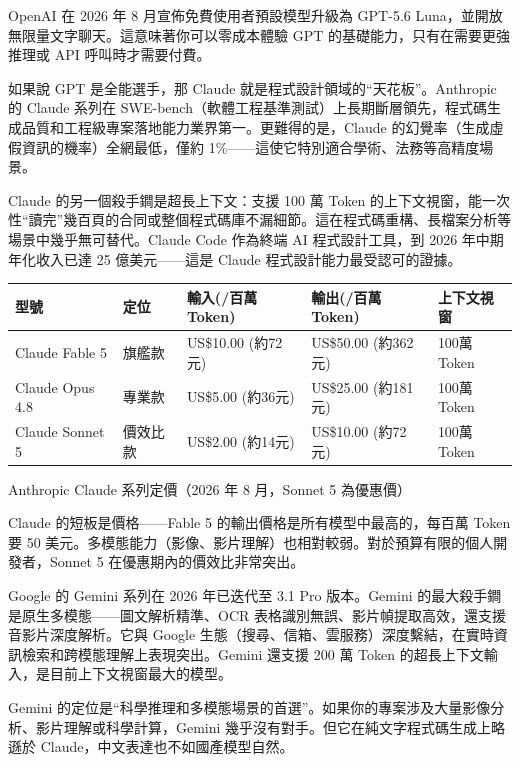 OpenAI 在 2026 年 8 月宣佈免費使用者預設模型升級為 GPT-5.6 Luna，並開放無限量文字聊天。這意味著你可以零成本體驗 GPT 的基礎能力，只有在需要更強推理或 API 呼叫時才需要付費。


如果說 GPT 是全能選手，那 Claude 就是程式設計領域的“天花板”。Anthropic 的 Claude 系列在 SWE-bench（軟體工程基準測試）上長期斷層領先，程式碼生成品質和工程級專案落地能力業界第一。更難得的是，Claude 的幻覺率（生成虛假資訊的機率）全網最低，僅約 1\%——這使它特別適合學術、法務等高精度場景。

Claude 的另一個殺手鐧是超長上下文：支援 100 萬 Token 的上下文視窗，能一次性“讀完”幾百頁的合同或整個程式碼庫不漏細節。這在程式碼重構、長檔案分析等場景中幾乎無可替代。Claude Code 作為終端 AI 程式設計工具，到 2026 年中期年化收入已達 25 億美元——這是 Claude 程式設計能力最受認可的證據。

\begin{center}
\begin{tabularx}{\linewidth}{|X|X|X|X|X|}
\hline
\textbf{型號} & \textbf{定位} & \textbf{輸入(/百萬Token)} & \textbf{輸出(/百萬Token)} & \textbf{上下文視窗} \tabularnewline
\hline
Claude Fable 5 & 旗艦款 & US\$10.00 (約72元) & US\$50.00 (約362元) & 100萬Token \tabularnewline
Claude Opus 4.8 & 專業款 & US\$5.00 (約36元) & US\$25.00 (約181元) & 100萬Token \tabularnewline
Claude Sonnet 5 & 價效比款 & US\$2.00 (約14元) & US\$10.00 (約72元) & 100萬Token \tabularnewline
\hline
\end{tabularx}
\end{center}

\begin{center}\small\color{gray}Anthropic Claude 系列定價（2026 年 8 月，Sonnet 5 為優惠價）\end{center}

Claude 的短板是價格——Fable 5 的輸出價格是所有模型中最高的，每百萬 Token 要 50 美元。多模態能力（影像、影片理解）也相對較弱。對於預算有限的個人開發者，Sonnet 5 在優惠期內的價效比非常突出。


Google 的 Gemini 系列在 2026 年已迭代至 3.1 Pro 版本。Gemini 的最大殺手鐧是原生多模態——圖文解析精準、OCR 表格識別無誤、影片幀提取高效，還支援音影片深度解析。它與 Google 生態（搜尋、信箱、雲服務）深度繫結，在實時資訊檢索和跨模態理解上表現突出。Gemini 還支援 200 萬 Token 的超長上下文輸入，是目前上下文視窗最大的模型。

Gemini 的定位是“科學推理和多模態場景的首選”。如果你的專案涉及大量影像分析、影片理解或科學計算，Gemini 幾乎沒有對手。但它在純文字程式碼生成上略遜於 Claude，中文表達也不如國產模型自然。

